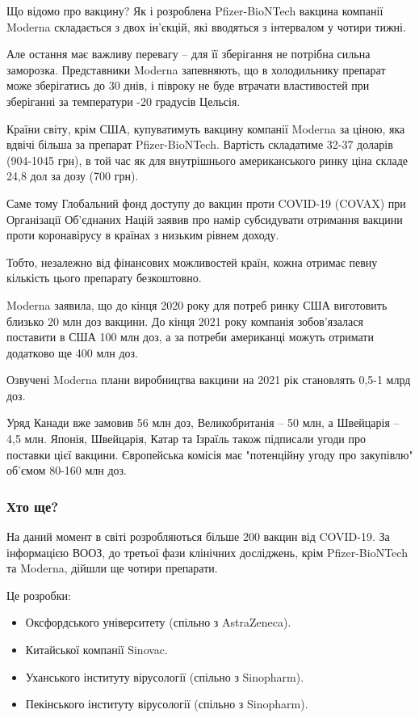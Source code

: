     Що відомо про вакцину? Як і розроблена Pfizer-BioNTech вакцина компанії Moderna складається з двох ін’єкцій, які вводяться з інтервалом у чотири тижні.

    Але остання має важливу перевагу – для її зберігання не потрібна сильна заморозка. Представники Moderna запевняють, що в холодильнику препарат може зберігатись до 30 днів, і півроку не буде втрачати властивостей при зберіганні за температури -20 градусів Цельсія.

    Країни світу, крім США, купуватимуть вакцину компанії Moderna за ціною, яка вдвічі більша за препарат Pfizer-BioNTech. Вартість складатиме 32-37 доларів (904-1045 грн), в той час як для внутрішнього американського ринку ціна складе 24,8 дол за дозу (700 грн).

Саме тому Глобальний фонд доступу до вакцин проти COVID-19 (COVAX) при Організації Об'єднаних Націй заявив про намір субсидувати отримання вакцини проти коронавірусу в країнах з низьким рівнем доходу.

Тобто, незалежно від фінансових можливостей країн, кожна отримає певну кількість цього препарату безкоштовно.

Moderna заявила, що до кінця 2020 року для потреб ринку США виготовить близько 20 млн доз вакцини. До кінця 2021 року компанія зобов’язалася поставити в США 100 млн доз, а за потреби американці можуть отримати додатково ще 400 млн доз.

    Озвучені Moderna плани виробництва вакцини на 2021 рік становлять 0,5-1 млрд доз.

Уряд Канади вже замовив 56 млн доз, Великобританія – 50 млн, а Швейцарія – 4,5
млн. Японія, Швейцарія, Катар та Ізраїль також підписали угоди про поставки
цієї вакцини. Європейська комісія має "потенційну угоду про закупівлю" об’ємом
80-160 млн доз.

\subsubsection{Хто ще?}

На даний момент в світі розробляються більше 200 вакцин від COVID-19. За
інформацією ВООЗ, до третьої фази клінічних досліджень, крім Pfizer-BioNTech та
Moderna, дійшли ще чотири препарати.

Це розробки:

\begin{itemize}
  \item Оксфордського університету (спільно з AstraZeneca).
  \item Китайської компанії Sinovac.
  \item Уханського інституту вірусології (спільно з Sinopharm).
  \item Пекінського інституту вірусології (спільно з Sinopharm).
\end{itemize}

